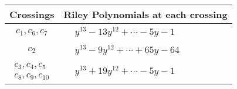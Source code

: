 \documentclass[1p]{elsarticle_modified}
\theoremstyle{definition}
\begin{document}
\begin{tabular}{m{50pt}|m{274pt}}
Crossings & \hspace{64pt}Riley Polynomials at each crossing \\
\hline $$\begin{aligned}c_{1},c_{6},c_{7}\end{aligned}$$&$\begin{aligned}
&y^{13}-13 y^{12}+\cdots-5 y-1
\end{aligned}$\\
\hline $$\begin{aligned}c_{2}\end{aligned}$$&$\begin{aligned}
&y^{13}-9 y^{12}+\cdots+65 y-64
\end{aligned}$\\
\hline $$\begin{aligned}c_{3},c_{4},c_{5}\\c_{8},c_{9},c_{10}\end{aligned}$$&$\begin{aligned}
&y^{13}+19 y^{12}+\cdots-5 y-1
\end{aligned}$\\
\hline
\end{tabular}
\vskip 2pc
\end{document}
